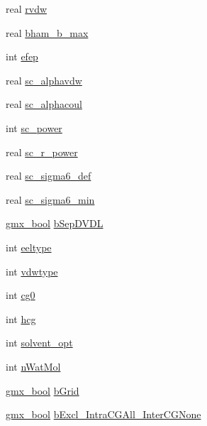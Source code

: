 \begin{DoxyCompactItemize}
\item 
real \hyperlink{structt__forcerec_a49ef8b02a97ad2af7bb54ce567c3fce8}{rvdw}
\item 
real \hyperlink{structt__forcerec_a0535dd6ceb58e114e9865ef64f6d52dc}{bham\-\_\-b\-\_\-max}
\item 
int \hyperlink{structt__forcerec_a90977991eb180bcdfccc54bd09a3d82c}{efep}
\item 
real \hyperlink{structt__forcerec_a830b9c2e9f2791b19f912fbc33af5ead}{sc\-\_\-alphavdw}
\item 
real \hyperlink{structt__forcerec_a1fecc83c036c7709c26bd49f7d25f3d5}{sc\-\_\-alphacoul}
\item 
int \hyperlink{structt__forcerec_a563b5fc9f1b0269d4b1770ab78c1528c}{sc\-\_\-power}
\item 
real \hyperlink{structt__forcerec_a95a837496d0604bb1d8405dd121fe5a2}{sc\-\_\-r\-\_\-power}
\item 
real \hyperlink{structt__forcerec_a7ac22992fccbcfabf995273d24cbf56a}{sc\-\_\-sigma6\-\_\-def}
\item 
real \hyperlink{structt__forcerec_a5ede5d15b2705cffebe786cb19d82139}{sc\-\_\-sigma6\-\_\-min}
\item 
\hyperlink{include_2types_2simple_8h_a8fddad319f226e856400d190198d5151}{gmx\-\_\-bool} \hyperlink{structt__forcerec_a8d5fc60c19c6e2e4435b6ff997b13bf1}{b\-Sep\-D\-V\-D\-L}
\item 
int \hyperlink{structt__forcerec_a2c4da53538a6746e931cae5e918a0cb9}{eeltype}
\item 
int \hyperlink{structt__forcerec_af1bbc39c608c2071e8f6f2c86e5d1b4a}{vdwtype}
\item 
int \hyperlink{structt__forcerec_a9b3e1b046ca88902349cfdbaae543cdc}{cg0}
\item 
int \hyperlink{structt__forcerec_af92bade0914512fbc360103759e14f35}{hcg}
\item 
int \hyperlink{structt__forcerec_a64b10ecdb429572015413ad245a59a7b}{solvent\-\_\-opt}
\item 
int \hyperlink{structt__forcerec_aa99a237f748be3770274eab988c9d808}{n\-Wat\-Mol}
\item 
\hyperlink{include_2types_2simple_8h_a8fddad319f226e856400d190198d5151}{gmx\-\_\-bool} \hyperlink{structt__forcerec_a838e6e5edb7a6913a63e8bf09055eca6}{b\-Grid}
\item 
\hyperlink{include_2types_2simple_8h_a8fddad319f226e856400d190198d5151}{gmx\-\_\-bool} \hyperlink{structt__forcerec_a575fc7bdb6ffeab5e2d3107715b549b8}{b\-Excl\-\_\-\-Intra\-C\-G\-All\-\_\-\-Inter\-C\-G\-None}

\end{DoxyCompactItemize}
